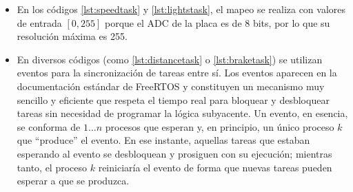 \begin{itemize}
  \item En los códigos \ref{lst:speedtask} y \ref{lst:lightstask}, el mapeo se realiza con valores
        de entrada $\left[0, 255\right]$ porque el ADC de la placa
        es de 8 bits, por lo que su resolución máxima es 255.
  \item En diversos códigos (como \ref{lst:distancetask} o \ref{lst:braketask}) se
        utilizan eventos para la sincronización de tareas entre sí. Los eventos
        aparecen en la documentación estándar de FreeRTOS y constituyen un mecanismo
        muy sencillo y eficiente que respeta el tiempo real para bloquear y desbloquear
        tareas sin necesidad de programar la lógica subyacente. Un evento, en esencia,
        se conforma de $1 \dots n$ procesos que esperan y, en principio, un único proceso
        $k$ que ``produce'' el evento. En ese instante, aquellas tareas que estaban
        esperando al evento se desbloquean y prosiguen con su ejecución; mientras tanto,
        el proceso $k$ reiniciaría el evento de forma que nuevas tareas pueden esperar
        a que se produzca.


\end{itemize}
